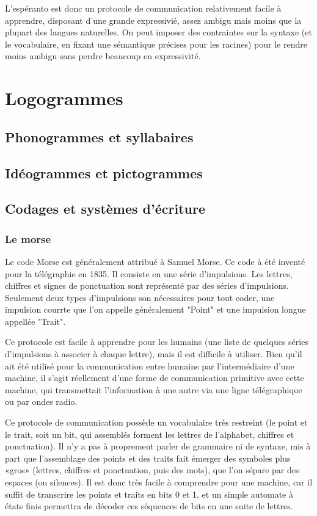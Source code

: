 \documentclass[french,a4paper]{article}
\begin{document}
L'espéranto est donc un protocole de communication relativement facile
à apprendre, disposant d'une grande expressivié, assez ambigu mais
moins que la plupart des langues naturelles. On peut imposer des
contraintes sur la syntaxe (et le vocabulaire, en fixant une
sémantique précises pour les racines) pour le rendre moins ambigu sans
perdre beaucoup en expressivité.

\section{Logogrammes}


\subsection{Phonogrammes et syllabaires}
\subsection{Idéogrammes et pictogrammes}

\subsection{Codages et systèmes d'écriture}
\subsubsection{Le morse}
Le code Morse est généralement attribué à Samuel Morse. Ce code à été
inventé pour la télégraphie en 1835.  Il consiste en une série
d'impulsions. Les lettres, chiffres et signes de ponctuation sont
représenté par des séries d'impulsions.  Seulement deux types
d'impulsions son nécessaires pour tout coder, une impulsion courrte
que l'on appelle généralement "Point" et une impulsion longue appellée
"Trait".

Ce protocole est facile à apprendre pour les humains (une liste de
quelques séries d'impulsions à associer à chaque lettre), mais il est
difficile à utiliser. Bien qu'il ait été utilisé pour la communication
entre humains par l'intermédiaire d'une machine, il s'agit réellement
d'une forme de communication primitive avec cette machine, qui
transmettait l'information à une autre via une ligne télégraphique ou
par ondes radio.

Ce protocole de communication possède un vocabulaire très restreint
(le point et le trait, soit un bit, qui assemblés forment les lettres
de l'alphabet, chiffres et ponctuation). Il n'y a pas à proprement
parler de grammaire ni de syntaxe, mis à part que l'assemblage des
points et des traits fait émerger des symboles plus «gros» (lettres,
chiffres et ponctuation, puis des mots), que l'on sépare par des
espaces (ou silences). Il est donc très facile à comprendre pour une
machine, car il suffit de transcrire les points et traits en bits 0 et
1, et un simple automate à états finis permettra de décoder ces
séquences de bits en une suite de lettres.
\end{document}
